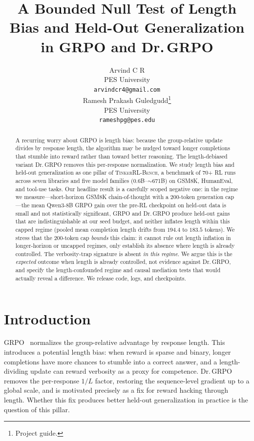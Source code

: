 \documentclass{article}
\title{A Bounded Null Test of Length Bias and Held-Out Generalization\\
       in GRPO and Dr.\,GRPO}
\author{
  Arvind C R \\
  PES University\\
  \texttt{arvindcr4@gmail.com} \\
  \And
  Ramesh Prakash Guledgudd\thanks{Project guide.} \\
  PES University\\
  \texttt{rameshpg@pes.edu} \\
}
\newcommand{\ours}{\textsc{TinkerRL-Bench}}
\begin{document}
\sloppy {}  \hfuzz=2pt
\maketitle
\begin{abstract}
A recurring worry about GRPO is length bias: because the group-relative update
divides by response length, the algorithm may be nudged toward longer completions
that stumble into reward rather than toward better reasoning. The length-debiased
variant Dr.\,GRPO removes this per-response normalization. We study length bias and
held-out generalization as one pillar of \ours{}, a benchmark of 70+ RL runs across
seven libraries and five model families ($0.6$B--$\sim$671B) on GSM8K, HumanEval,
and tool-use tasks. Our headline result is a carefully scoped negative one: in the
regime we measure---short-horizon GSM8K chain-of-thought with a 200-token
generation cap---the mean Qwen3-8B GRPO
gain over the pre-RL checkpoint on held-out data is small and not statistically
significant, GRPO and Dr.\,GRPO produce held-out gains that are indistinguishable
at our seed budget, and neither inflates length within this capped regime (pooled
mean completion length drifts from $194.4$ to $183.5$ tokens). We stress that the
$200$-token cap \emph{bounds} this claim: it cannot rule out length inflation in
longer-horizon or uncapped regimes, only establish its absence where length is
already controlled. The verbosity-trap signature is absent \emph{in this regime}. We argue this is the
\emph{expected} outcome when length is already controlled, not evidence against
Dr.\,GRPO, and specify the length-confounded regime and causal mediation tests that
would actually reveal a difference. We release code, logs, and checkpoints.
\end{abstract}
 \section{Introduction}
\label{sec:p4-intro}
GRPO~\citep{shao2024deepseekmath, guo2025deepseekr1} normalizes the group-relative
advantage by response length. This introduces a potential length bias: when reward
is sparse and binary, longer completions have more chances to stumble into a
correct answer, and a length-dividing update can reward verbosity as a proxy for
competence. Dr.\,GRPO~\citep{tong2025drgrpo} removes the per-response
$1/L$ factor, restoring the sequence-level gradient up to a global scale, and is
motivated precisely as a fix for reward hacking through length. Whether this fix
produces better held-out generalization in practice is the question of this pillar.
\end{document}
